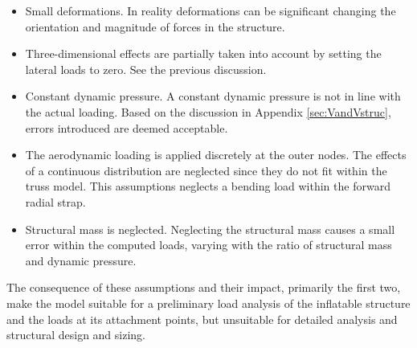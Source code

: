 \begin{itemize}
\item Small deformations. In reality deformations can be significant changing the orientation and magnitude of forces in the structure.
\item Three-dimensional effects are partially taken into account by setting the lateral loads to zero. See the previous discussion.
\item Constant dynamic pressure. A constant dynamic pressure is not in line with the actual loading. Based on the discussion in Appendix \ref{sec:VandVstruc}, errors introduced are deemed acceptable.
\item The aerodynamic loading is applied discretely at the outer nodes. The effects of a continuous distribution are neglected since they do not fit within the truss model. This assumptions neglects a bending load within the forward radial strap. 
\item Structural mass is neglected. Neglecting the structural mass causes a small error within the computed loads, varying with the ratio of structural mass and dynamic pressure.
\end{itemize} 
The consequence of these assumptions and their impact, primarily the first two, make the model suitable for a preliminary load analysis of the inflatable structure and the loads at its attachment points, but unsuitable for detailed analysis and structural design and sizing. %





